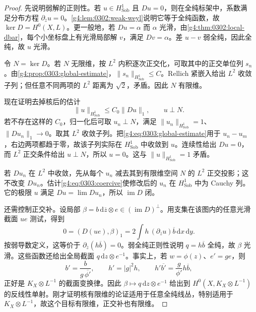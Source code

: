 \begin{proof}
	先说明弱解的正则性。若 \(u\in H^1_{\mathrm{Sob}}\) 且 \(Du=0\)，则在全纯标架中，系数满足分布方程 \(\partial_{\overline z}u=0\)。\cref{g4:lem:0302:weak-weyl}说明它等于全纯函数，故 \(\ker D=H^0(X,L)\)。更一般地，若 \(Du=\alpha\) 而 \(\alpha\) 光滑，由\cref{g4:thm:0302:local-dbar}，每个小坐标盘上有光滑局部解 \(v\)，满足 \(Dv=\alpha\)。差 \(u-v\) 弱全纯，因此全纯，故 \(u\) 光滑。

	令 \(N=\ker D\)。若 \(N\) 无限维，按 \(L^2\) 内积逐次正交化，可取其中的正交单位列 \(s_n\)。由\cref{g4:prop:0303:global-estimate}，\(\|s_n\|_{H^1_{\mathrm{Sob}}}\le C\)。Rellich 紧嵌入给出 \(L^2\) 收敛子列；但任意不同两项的 \(L^2\) 距离为 \(\sqrt2\)，矛盾。因此 \(N\) 有限维。

	现在证明去掉核后的估计
	\begin{equation}
		\label{g4:eq:0303:coercive}
		\|u\|_{H^1_{\mathrm{Sob}}}\le C_0\|Du\|_1,
		\qquad u\perp N.
	\end{equation}
	若不存在这样的 \(C_0\)，归一化后可取 \(u_n\perp N\)，满足 \(\|u_n\|_{H^1_{\mathrm{Sob}}}=1\)、\(\|Du_n\|_1\to0\)。取其 \(L^2\) 收敛子列。把\eqref{g4:eq:0303:global-estimate}用于 \(u_n-u_m\)，右边两项都趋于零，故该子列实际在 \(H^1_{\mathrm{Sob}}\) 中收敛到 \(u\)。连续性给出 \(Du=0\)，而 \(L^2\) 正交条件给出 \(u\perp N\)，所以 \(u=0\)。这与 \(\|u\|_{H^1_{\mathrm{Sob}}}=1\) 矛盾。

	若 \(Du_n\) 在 \(L^2\) 中收敛，先从每个 \(u_n\) 减去其到有限维空间 \(N\) 的 \(L^2\) 正交投影；这不改变 \(Du_n\)。估计\eqref{g4:eq:0303:coercive}使修改后的 \(u_n\) 在 \(H^1_{\mathrm{Sob}}\) 中为 Cauchy 列。它的极限 \(u\) 满足 \(Du=\lim Du_n\)，所以 \(\operatorname{im}D\) 闭。

	还需控制正交补。设局部 \(\beta=b\,\mathrm{d}\overline z\otimes e\in(\operatorname{im}D)^\perp\)。用支集在该图内的任意光滑截面 \(u e\) 测试，得到
	\[
		0=(D(u e),\beta)_1
		=2\int h\,(\partial_{\overline z}u)\overline b\,
		\mathrm{d}x\,\mathrm{d}y.
	\]
	按弱导数定义，这等价于 \(\partial_{\overline z}(h\overline b)=0\)。弱全纯正则性说明 \(q=h\overline b\) 全纯，故 \(\beta\) 光滑。这些函数还给出全局截面 \(q\,\mathrm{d}z\otimes e^{-1}\)。事实上，若 \(w=\phi(z)\)、\(e'=g e\)，则
	\[
		b'=\frac{b}{g\,\overline{\phi'}},\qquad
		h'=|g|^2h,\qquad
		h'\overline{b'}=\frac{g}{\phi'}h\overline b,
	\]
	正好是 \(K_X\otimes L^{-1}\) 的截面变换律。因此 \(\beta\mapsto q\,\mathrm{d}z\otimes e^{-1}\) 给出到 \(H^0(X,K_X\otimes L^{-1})\) 的反线性单射。刚才证明核有限维的论证适用于任意全纯线丛，特别适用于 \(K_X\otimes L^{-1}\)，故这个目标有限维，正交补也有限维。


\end{proof}
